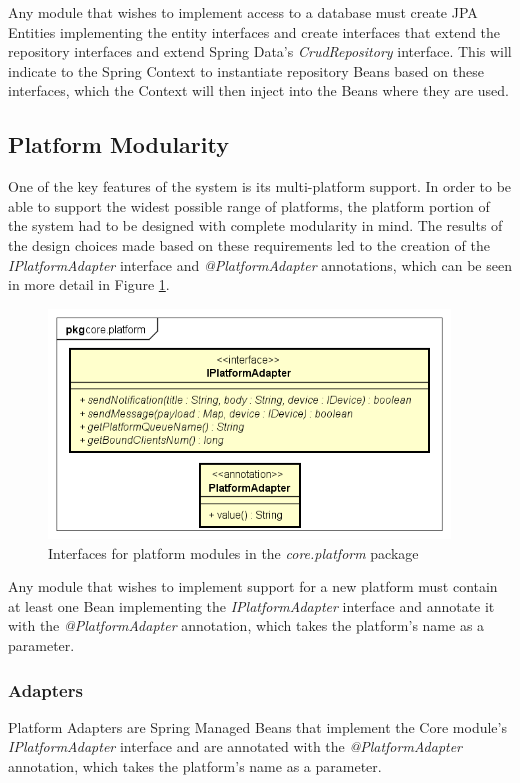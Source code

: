 Any module that wishes to implement access to a database must create JPA Entities implementing the entity interfaces and create interfaces that extend the repository interfaces and extend Spring Data's \textit{CrudRepository} interface. This will indicate to the Spring Context to instantiate repository Beans based on these interfaces\cite{spring-repos}, which the Context will then inject into the Beans where they are used.

\subsection{Platform Modularity}
One of the key features of the system is its multi-platform support. In order to be able to support the widest possible range of platforms, the platform portion of the system had to be designed with complete modularity in mind. The results of the design choices made based on these requirements led to the creation of the \textit{IPlatformAdapter} interface and \textit{@PlatformAdapter} annotations, which can be seen in more detail in Figure \ref{fig:core-platform-module}.

\begin{figure}[!htb]
	\centering
	\includegraphics[width=0.95\textwidth]{figures/03_design/core-platform-module}
    \caption{Interfaces for platform modules in the \textit{core.platform} package}
    \label{fig:core-platform-module}
\end{figure}

Any module that wishes to implement support for a new platform must contain at least one Bean implementing the \textit{IPlatformAdapter} interface and annotate it with the \textit{@PlatformAdapter} annotation, which takes the platform's name as a parameter.

\subsubsection{Adapters}\label{sec:adapters}
Platform Adapters are Spring Managed Beans that implement the Core module's \textit{IPlatformAdapter} interface and are annotated with the \textit{@PlatformAdapter} annotation, which takes the platform's name as a parameter. 

